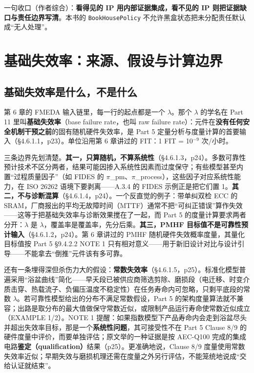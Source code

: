 一句收口（作者综合）：\textbf{看得见的 IP 用内部证据集成，看不见的 IP 则把证据缺口与责任边界写清}。本书的 \nolinkurl{BookHousePolicy} 不允许黑盒状态把未分配责任默认成“无人处理”。

\section{基础失效率：来源、假设与计算边界}

\subsection{基础失效率是什么，不是什么}

第 6 章的 FMEDA 输入链里，每一行的起点都是一个 \(\lambda\)。那个 \(\lambda\) 的学名在 Part 11 里叫\textbf{基础失效率}（base failure rate，也叫 raw failure rate）：元件在\textbf{没有任何安全机制干预之前}的固有随机硬件失效率，是 Part 5 定量分析与度量计算的首要输入（§4.6.1.1，p23）。单位沿用第 6 章讲过的 FIT：1 FIT = 10\(^{-9}\) 次/小时。

三条边界先划清楚。\textbf{其一，只算随机，不算系统性}（§4.6.1.3，p24）。多数可靠性预计技术不区分两者，结果可能因掺入系统性因素而过度保守；有些模型甚至内置“过程质量因子”（如 FIDES 的 \(\pi\)\_pm、\(\pi\)\_process），这些因子对应系统性能力，在 ISO 26262 语境下要剥离——A.3.4 的 FIDES 示例正是把它们置 1。\textbf{其二，不与诊断混算}（§4.6.1.4，p24）。一个反直觉的例子：带单纠双检 ECC 的 SRAM，厂商报出的平均无故障时间（MTTF）通常不把“可纠正错误”算作失效——这等于把基础失效率与诊断效果搅在了一起，而 Part 5 的度量计算要求两者分开：\(\lambda\) 是 \(\lambda\)，覆盖率是覆盖率，先分后乘。\textbf{其三，PMHF 目标值不是可靠性预计输入}（§4.6.1.2，p24）。第 6 章讲过的 PMHF 随机硬件失效概率度量，其量化目标值按 Part 5 §9.4.2.2 NOTE 1 只有相对意义——用于新旧设计对比与设计引导——不能拿去“倒推”元件该有多可靠。

还有一条埋得深但杀伤力大的假设：\textbf{常数失效率}（§4.6.1.5，p25）。标准化模型普遍采用“浴盆曲线”简化——早夭段已被供应商筛选剪除、磨损段（电迁移、时变介质击穿、热载流子、负偏压温度不稳定性）在任务寿命内可忽略，只剩平底段的常数 \(\lambda\)。若可靠性模型给出的分布不满足常数假设，Part 5 的架构度量算法就不兼容；出路是取分布的最大值做保守常数近似，或限制产品运行寿命使常数近似成立（EXAMPLE 1/2）。NOTE 1 提醒：如果指数模型下产品寿命内会走到浴盆尽头并超出失效率目标，那是一个\textbf{系统性问题}，其可接受性不在 Part 5 Clause 8/9 的硬件度量中评价，而要单独评估；原文举的一种证据是按 AEC-Q100 完成的集成电路\textbf{鉴定（qualification）}结果（p25）。更准确地说，Clause 8/9 度量使用常数失效率近似；早期失效与磨损机理还需在度量之外另行评估，不能笼统地说成“交给认证就结束”。


